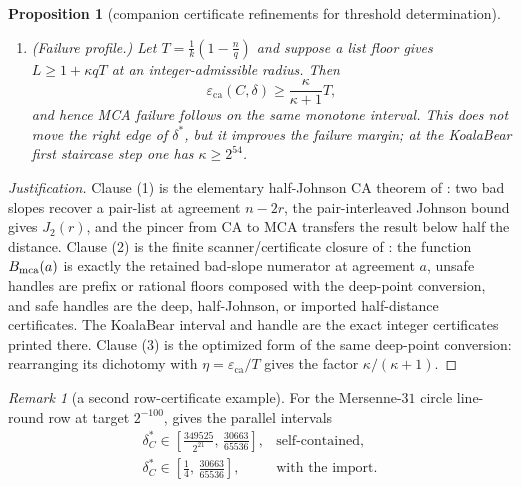 \documentclass[11pt]{amsart}
\newtheorem{proposition}[proposition]{Proposition}
\theoremstyle{definition}
\theoremstyle{remark}
\newtheorem{remark}[remark]{Remark}
\newcommand{\eca}{\varepsilon_{\mathrm{ca}}}
\begin{document}
\begin{proposition}[companion certificate refinements for threshold determination]
\begin{enumerate}
\[\begin{array}{ll}
        &\text{self-contained,}\\[2mm]
        \delta^*_C(2^{-128})\in
        \left[\frac14,\,\frac{15331}{32768}\right],
        &\text{with the imported half-distance theorem.}
\end{array}
\]
The optimized unsafe handle behind the KoalaBear upper edge is
\[
        (c,m,w,\Delta)=(16,69748,4211,67392),
        \qquad
        1-\frac{mc}{n}
        =
        1-\frac{16\cdot69748}{2^{21}}
        =
        \frac{15331}{32768}.
\]
Here $\Delta$ is the checked surplus in the companion certificate.
The same certificate framework applies to map-smooth, circle, and genus-one/rational-smooth rows after the transports proved in \cite{Cho26b}.
\item \textup{(Failure profile.)} Let $T=\frac1k(1-\frac nq)$ and suppose a list floor gives $L\ge1+\kappa qT$ at an integer-admissible radius.  Then
\[
        \eca(C,\delta)\ge\frac{\kappa}{\kappa+1}T,
\]
and hence MCA failure follows on the same monotone interval.  This does not move the right edge of $\delta^*$, but it improves the failure margin; at the KoalaBear first staircase step one has $\kappa\ge2^{54}$.
\end{enumerate}
\end{proposition}

\begin{proof}[Justification]
Clause \textup{(1)} is the elementary half-Johnson CA theorem of \cite{Cho26b}: two bad slopes recover a pair-list at agreement $n-2r$, the pair-interleaved Johnson bound gives $J_2(r)$, and the pincer from CA to MCA transfers the result below half the distance. Clause \textup{(2)} is the finite scanner/certificate closure of \cite{Cho26b}: the function $B_{\rm mca}(a)$ is exactly the retained bad-slope numerator at agreement $a$, unsafe handles are prefix or rational floors composed with the deep-point conversion, and safe handles are the deep, half-Johnson, or imported half-distance certificates. The KoalaBear interval and handle are the exact integer certificates printed there. Clause \textup{(3)} is the optimized form of the same deep-point conversion: rearranging its dichotomy with $\eta=\eca/T$ gives the factor $\kappa/(\kappa+1)$.
\end{proof}

\begin{remark}[a second row-certificate example]\label{rem:circle-certificate}
For the Mersenne-$31$ circle line-round row at target $2^{-100}$, \cite{Cho26b} gives the parallel intervals
\[
\begin{array}{ll}
        \delta^*_C\in
        \left[\frac{349525}{2^{21}},\,\frac{30663}{65536}\right],
        &\text{self-contained,}\\[2mm]
        \delta^*_C\in
        \left[\frac14,\,\frac{30663}{65536}\right],
        &\text{with the import.}
\end{array}
\]
\end{remark}
\end{document}
